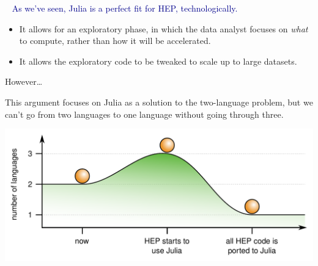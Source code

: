 \documentclass[aspectratio=169]{beamer}
\begin{document}
\begin{frame}{\mbox{ }}
\large
\vspace{0.5 cm}
\textcolor{darkblue}{\Large As we've seen, Julia is a perfect fit for HEP, technologically.}

\vspace{0.5 cm}
\begin{itemize}\setlength{\itemsep}{0.25 cm}
\item<2-> It allows for an exploratory phase, in which the data analyst focuses on {\it what} to compute, rather than how it will be accelerated.
\item<3-> It allows the exploratory code to be tweaked to scale up to large datasets.
\end{itemize}

\vspace{0.5 cm}
\end{frame}

\begin{frame}{However\ldots}
\vspace{0.5 cm}
\large
\begin{center}
This argument focuses on Julia as a solution to the two-language problem, but we can't go from two languages to one language without going through three.
\end{center}

\vspace{0.25 cm}
\includegraphics[width=\linewidth]{number-of-languages.pdf}
\end{frame}
\end{document}
